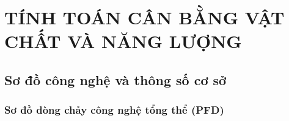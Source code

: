 \documentclass[../main.tex]{subfiles}
\begin{document}
\chapter{TÍNH TOÁN CÂN BẰNG VẬT CHẤT VÀ NĂNG LƯỢNG}
\label{chuong3}

\section{Sơ đồ công nghệ và thông số cơ sở}


\subsection{Sơ đồ dòng chảy công nghệ tổng thể (PFD)}
\label{sec:so-do-pfd}
\end{document}
